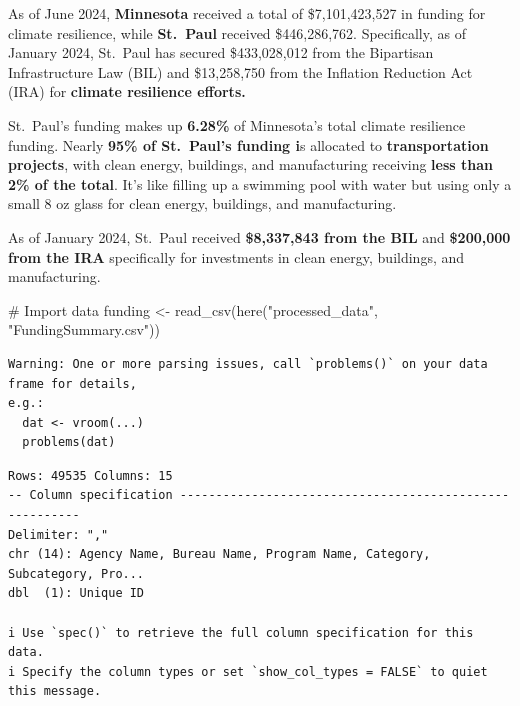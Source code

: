 \documentclass[
  letterpaper,
  DIV=11,
  numbers=noendperiod]{scrartcl}
\newenvironment{Shaded}{\begin{snugshade}}{\end{snugshade}}
\newcommand{\CommentTok}[1]{\textcolor[rgb]{0.37,0.37,0.37}{#1}}
\newcommand{\FunctionTok}[1]{\textcolor[rgb]{0.28,0.35,0.67}{#1}}
\newcommand{\NormalTok}[1]{\textcolor[rgb]{0.00,0.23,0.31}{#1}}
\newcommand{\OtherTok}[1]{\textcolor[rgb]{0.00,0.23,0.31}{#1}}
\newcommand{\StringTok}[1]{\textcolor[rgb]{0.13,0.47,0.30}{#1}}
\begin{document}
\begin{tcolorbox}[enhanced jigsaw, coltitle=black, opacitybacktitle=0.6, rightrule=.15mm, colframe=quarto-callout-note-color-frame, bottomtitle=1mm, title=\textcolor{quarto-callout-note-color}{\faInfo}\hspace{0.5em}{RQ 1: How much climate resilience funding has the City of Saint Paul
received?}, breakable, colback=white, toptitle=1mm, titlerule=0mm, arc=.35mm, opacityback=0, left=2mm, bottomrule=.15mm, toprule=.15mm, colbacktitle=quarto-callout-note-color!10!white, leftrule=.75mm]

As of June 2024, \textbf{Minnesota} received a total of \$7,101,423,527
in funding for climate resilience, while \textbf{St.~Paul} received
\$446,286,762. Specifically, as of January 2024, St.~Paul has secured
\$433,028,012 from the Bipartisan Infrastructure Law (BIL) and
\$13,258,750 from the Inflation Reduction Act (IRA) for \textbf{climate
resilience efforts.}

St.~Paul's funding makes up \textbf{6.28\%} of Minnesota's total climate
resilience funding. Nearly \textbf{95\% of St.~Paul's funding i}s
allocated to \textbf{transportation} \textbf{projects}, with clean
energy, buildings, and manufacturing receiving \textbf{less than 2\% of
the total}. It's like filling up a swimming pool with water but using
only a small 8 oz glass for clean energy, buildings, and manufacturing.

As of January 2024, St.~Paul received \textbf{\$8,337,843 from the BIL}
and \textbf{\$200,000 from the IRA} specifically for investments in
clean energy, buildings, and manufacturing.

\end{tcolorbox}

\begin{Shaded}
\begin{Highlighting}[]
\CommentTok{\# Import data}
\NormalTok{funding }\OtherTok{\textless{}{-}} \FunctionTok{read\_csv}\NormalTok{(}\FunctionTok{here}\NormalTok{(}\StringTok{"processed\_data"}\NormalTok{, }\StringTok{"FundingSummary.csv"}\NormalTok{))}
\end{Highlighting}
\end{Shaded}

\begin{verbatim}
Warning: One or more parsing issues, call `problems()` on your data frame for details,
e.g.:
  dat <- vroom(...)
  problems(dat)
\end{verbatim}

\begin{verbatim}
Rows: 49535 Columns: 15
-- Column specification --------------------------------------------------------
Delimiter: ","
chr (14): Agency Name, Bureau Name, Program Name, Category, Subcategory, Pro...
dbl  (1): Unique ID

i Use `spec()` to retrieve the full column specification for this data.
i Specify the column types or set `show_col_types = FALSE` to quiet this message.
\end{verbatim}
\end{document}
